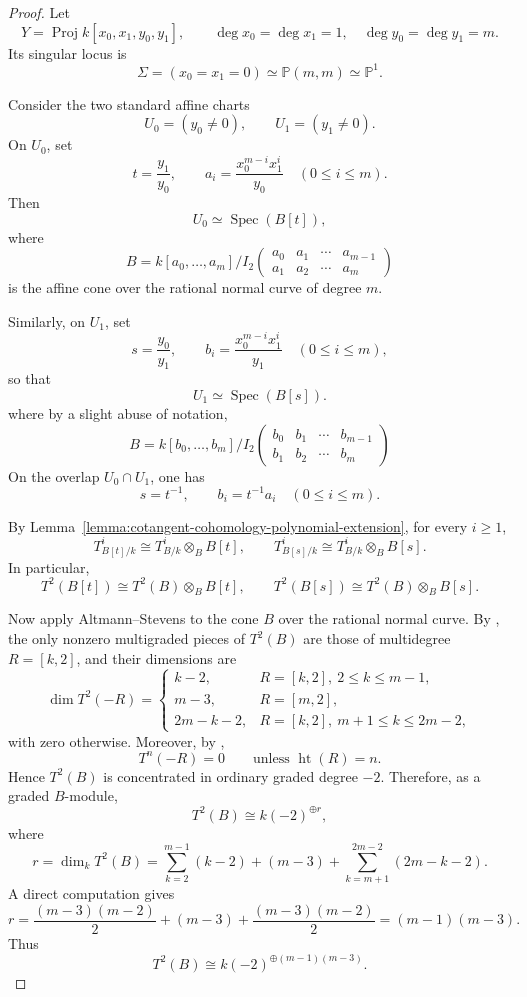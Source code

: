\documentclass[11pt,twoside]{amsart}
\theoremstyle{plain}
\numberwithin{equation}{section}
\DeclareMathOperator{\Spec}{Spec}
\DeclareMathOperator{\Proj}{Proj}
\newcommand{\PP}{\mathbb{P}}
\theoremstyle{definition}
\begin{document}
\begin{proof}
Let
\[
Y=\Proj k[x_0,x_1,y_0,y_1],
\qquad
\deg x_0=\deg x_1=1,\quad \deg y_0=\deg y_1=m.
\]
Its singular locus is
\[
\Sigma=(x_0=x_1=0)\simeq \PP(m,m)\simeq \PP^1.
\]

Consider the two standard affine charts
\[
U_0=(y_0\neq 0),\qquad U_1=(y_1\neq 0).
\]
On \(U_0\), set
\[
t=\frac{y_1}{y_0},
\qquad
a_i=\frac{x_0^{m-i}x_1^i}{y_0}
\quad (0\leq i\leq m).
\]
Then
\[
U_0\simeq \Spec(B[t]),
\]
where
\[
B=
k[a_0,\dots,a_m]\Big/
I_2\!\begin{pmatrix}
a_0&a_1&\cdots&a_{m-1}\\
a_1&a_2&\cdots&a_m
\end{pmatrix}
\]
is the affine cone over the rational normal curve of degree \(m\).

Similarly, on \(U_1\), set
\[
s=\frac{y_0}{y_1},
\qquad
b_i=\frac{x_0^{m-i}x_1^i}{y_1}
\quad (0\leq i\leq m),
\]
so that
\[
U_1\simeq \Spec(B[s]).
\]
where by a slight abuse of notation,
\[
B=
k[b_0,\dots,b_m]\Big/
I_2\!\begin{pmatrix}
b_0&b_1&\cdots&b_{m-1}\\
b_1&b_2&\cdots&b_m
\end{pmatrix}
\]
On the overlap \(U_0\cap U_1\), one has
\[
s=t^{-1},
\qquad
b_i=t^{-1}a_i
\quad (0\leq i\leq m).
\]

By Lemma~\ref{lemma:cotangent-cohomology-polynomial-extension}, for every \(i\geq 1\),
\[
T^i_{B[t]/k}\cong T^i_{B/k}\otimes_B B[t],
\qquad
T^i_{B[s]/k}\cong T^i_{B/k}\otimes_B B[s].
\]
In particular,
\[
T^2(B[t])\cong T^2(B)\otimes_B B[t],
\qquad
T^2(B[s])\cong T^2(B)\otimes_B B[s].
\]

Now apply Altmann--Stevens to the cone \(B\) over the rational normal curve.
By \cite[\S4.2(2)]{AltmannStevens}, the only nonzero multigraded pieces of \(T^2(B)\) are
those of multidegree \(R=[k,2]\), and their dimensions are
\[
\dim T^2(-R)=
\begin{cases}
k-2,& R=[k,2],\ 2\leq k\leq m-1,\\[2mm]
m-3,& R=[m,2],\\[2mm]
2m-k-2,& R=[k,2],\ m+1\leq k\leq 2m-2,
\end{cases}
\]
with zero otherwise. Moreover, by \cite[Proposition~4.3(2)]{AltmannStevens},
\[
T^n(-R)=0 \qquad \text{unless } \operatorname{ht}(R)=n.
\]
Hence \(T^2(B)\) is concentrated in ordinary graded degree \(-2\). Therefore, as a graded
\(B\)-module,
\[
T^2(B)\cong k(-2)^{\oplus r},
\]
where
\[
r=\dim_k T^2(B)
=
\sum_{k=2}^{m-1}(k-2)+(m-3)+\sum_{k=m+1}^{2m-2}(2m-k-2).
\]
A direct computation gives
\[
r=\frac{(m-3)(m-2)}{2}+(m-3)+\frac{(m-3)(m-2)}{2}=(m-1)(m-3).
\]
Thus
\[
T^2(B)\cong k(-2)^{\oplus (m-1)(m-3)}.
\]


\end{proof}
\end{document}
